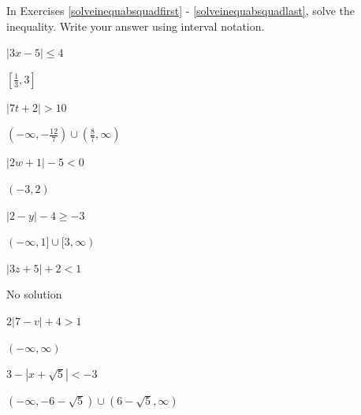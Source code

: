 \documentclass{ximera}
\begin{document}
\begin{question}
In Exercises \ref{solveinequabsquadfirst} - \ref{solveinequabsquadlast}, solve the inequality.  Write your answer using interval notation. 

\begin{problem}\label{solveinequabsquadfirst}
$|3x - 5| \leq 4$ 

\begin{solution}
     $\left[\frac{1}{3}, 3\right]$
\end{solution}
\end{problem}

\begin{problem}
$|7t + 2| > 10$

\begin{solution}
     $\left(-\infty, -\frac{12}{7} \right) \cup \left(\frac{8}{7}, \infty\right)$
\end{solution}
\end{problem}

\begin{problem}
$|2w+1| - 5 < 0$

\begin{solution}
    $(-3,2)$
\end{solution}
\end{problem}

\begin{problem}
$|2-y| - 4 \geq -3$

\begin{solution}
    $(-\infty,1] \cup [3,\infty)$
\end{solution}
\end{problem}

\begin{problem}
$|3z+5| + 2 < 1$

\begin{solution}
    No solution
\end{solution}
\end{problem}

\begin{problem}
$2|7-v| +4 > 1$

\begin{solution}
    $(-\infty, \infty)$
\end{solution}
\end{problem}

\begin{problem}
$3 - |x+\sqrt{5}| < -3$

\begin{solution}
     $(-\infty, -6-\sqrt{5}) \cup (6-\sqrt{5}, \infty)$
\end{solution}
\end{problem}


\end{question}
\end{document}

